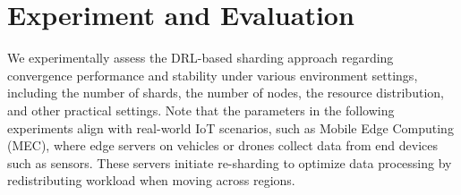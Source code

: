 
\section{Experiment and Evaluation}
\label{section: experiment}



We experimentally assess the DRL-based sharding approach regarding convergence performance and stability under various environment settings, including the number of shards, the number of nodes, the resource distribution, and other practical settings. Note that the parameters in the following experiments align with real-world IoT scenarios, such as Mobile Edge Computing (MEC), where edge servers on vehicles or drones collect data from end devices such as sensors. These servers initiate re-sharding to optimize data processing by redistributing workload when moving across regions. 



